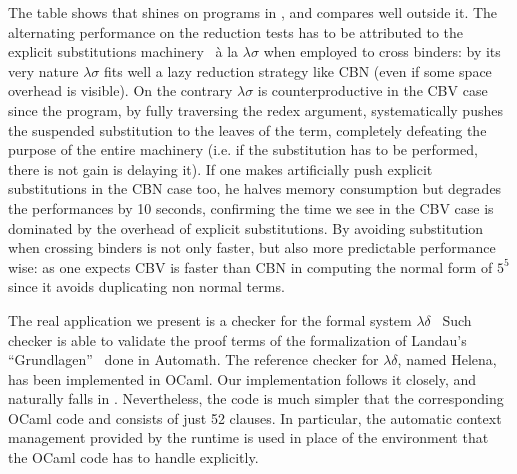 \documentclass{llncs}
\begin{document}
The table shows that \elpi{} shines on programs in \rff{}, and compares well
outside it. The alternating performance \tedius{} on the reduction tests has
to be attributed to the explicit substitutions machinery~\cite{DBLP:journals/jar/LiangNQ04} \`a la $\lambda\sigma$ when employed to cross binders:
by its very nature $\lambda\sigma$ fits well a lazy reduction strategy like
CBN (even if some space
overhead is visible).  On the contrary $\lambda\sigma$ is counterproductive
in the CBV case since the program, by fully traversing the redex argument,
systematically pushes the suspended substitution to the leaves of the
term, completely defeating the purpose of the entire machinery (i.e. if the
substitution has to be performed, there is not gain is delaying it).
If one makes \tedius{} artificially
push explicit substitutions in the CBN case too, he halves memory consumption
but degrades the performances by 10 seconds, confirming the
time we see in the CBV case is dominated by the overhead of explicit substitutions. By avoiding substitution when crossing binders
\elpi{} is not only faster, but also more predictable performance wise: as one
expects CBV is faster than CBN in computing the normal form of $5^5$ since
it avoids duplicating non normal terms.


The real application we present is a checker for the formal system
$\lambda\delta$~\cite{lambdadeltaJ1,lambdadeltaJ3a} Such
checker is able to validate the proof terms of the formalization of Landau's
``Grundlagen''~\cite{Jut79} done in Automath. The reference checker for
$\lambda\delta$, named Helena, has been implemented in OCaml.
Our \lp{} implementation follows it closely, and
naturally falls in \rff{}.
Nevertheless, the \lp{} code is much simpler that the corresponding OCaml code
and consists of just 52 clauses. In particular, the automatic
context management provided by the \lp{} runtime is used in place of the
environment that the OCaml code has to handle explicitly.
\end{document}

